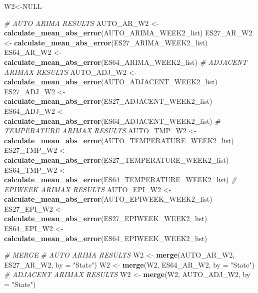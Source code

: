 \documentclass[
]{article}
\newenvironment{Shaded}{\begin{snugshade}}{\end{snugshade}}
\newcommand{\AttributeTok}[1]{\textcolor[rgb]{0.13,0.29,0.53}{#1}}
\newcommand{\CommentTok}[1]{\textcolor[rgb]{0.56,0.35,0.01}{\textit{#1}}}
\newcommand{\ConstantTok}[1]{\textcolor[rgb]{0.56,0.35,0.01}{#1}}
\newcommand{\FunctionTok}[1]{\textcolor[rgb]{0.13,0.29,0.53}{\textbf{#1}}}
\newcommand{\NormalTok}[1]{#1}
\newcommand{\OtherTok}[1]{\textcolor[rgb]{0.56,0.35,0.01}{#1}}
\newcommand{\StringTok}[1]{\textcolor[rgb]{0.31,0.60,0.02}{#1}}
\begin{document}
\begin{Shaded}
\begin{Highlighting}[]
\NormalTok{W2}\OtherTok{\textless{}{-}}\ConstantTok{NULL}

\CommentTok{\# AUTO ARIMA RESULTS}
\NormalTok{AUTO\_AR\_W2 }\OtherTok{\textless{}{-}} \FunctionTok{calculate\_mean\_abs\_error}\NormalTok{(AUTO\_ARIMA\_WEEK2\_list)}
\NormalTok{ES27\_AR\_W2 }\OtherTok{\textless{}{-}} \FunctionTok{calculate\_mean\_abs\_error}\NormalTok{(ES27\_ARIMA\_WEEK2\_list)}
\NormalTok{ES64\_AR\_W2 }\OtherTok{\textless{}{-}} \FunctionTok{calculate\_mean\_abs\_error}\NormalTok{(ES64\_ARIMA\_WEEK2\_list)}
\CommentTok{\# ADJACENT ARIMAX RESULTS}
\NormalTok{AUTO\_ADJ\_W2 }\OtherTok{\textless{}{-}} \FunctionTok{calculate\_mean\_abs\_error}\NormalTok{(AUTO\_ADJACENT\_WEEK2\_list)}
\NormalTok{ES27\_ADJ\_W2 }\OtherTok{\textless{}{-}} \FunctionTok{calculate\_mean\_abs\_error}\NormalTok{(ES27\_ADJACENT\_WEEK2\_list)}
\NormalTok{ES64\_ADJ\_W2 }\OtherTok{\textless{}{-}} \FunctionTok{calculate\_mean\_abs\_error}\NormalTok{(ES64\_ADJACENT\_WEEK2\_list)}
\CommentTok{\# TEMPERATURE ARIMAX RESULTS}
\NormalTok{AUTO\_TMP\_W2 }\OtherTok{\textless{}{-}} \FunctionTok{calculate\_mean\_abs\_error}\NormalTok{(AUTO\_TEMPERATURE\_WEEK2\_list)}
\NormalTok{ES27\_TMP\_W2 }\OtherTok{\textless{}{-}} \FunctionTok{calculate\_mean\_abs\_error}\NormalTok{(ES27\_TEMPERATURE\_WEEK2\_list)}
\NormalTok{ES64\_TMP\_W2 }\OtherTok{\textless{}{-}} \FunctionTok{calculate\_mean\_abs\_error}\NormalTok{(ES64\_TEMPERATURE\_WEEK2\_list)}
\CommentTok{\# EPIWEEK ARIMAX RESULTS}
\NormalTok{AUTO\_EPI\_W2 }\OtherTok{\textless{}{-}} \FunctionTok{calculate\_mean\_abs\_error}\NormalTok{(AUTO\_EPIWEEK\_WEEK2\_list)}
\NormalTok{ES27\_EPI\_W2 }\OtherTok{\textless{}{-}} \FunctionTok{calculate\_mean\_abs\_error}\NormalTok{(ES27\_EPIWEEK\_WEEK2\_list)}
\NormalTok{ES64\_EPI\_W2 }\OtherTok{\textless{}{-}} \FunctionTok{calculate\_mean\_abs\_error}\NormalTok{(ES64\_EPIWEEK\_WEEK2\_list)}

\CommentTok{\# MERGE}
\CommentTok{\# AUTO ARIMA RESULTS}
\NormalTok{W2 }\OtherTok{\textless{}{-}} \FunctionTok{merge}\NormalTok{(AUTO\_AR\_W2, ES27\_AR\_W2, }\AttributeTok{by =} \StringTok{"State"}\NormalTok{)}
\NormalTok{W2 }\OtherTok{\textless{}{-}} \FunctionTok{merge}\NormalTok{(W2, ES64\_AR\_W2, }\AttributeTok{by =} \StringTok{"State"}\NormalTok{)}
\CommentTok{\# ADJACENT ARIMAX RESULTS}
\NormalTok{W2 }\OtherTok{\textless{}{-}} \FunctionTok{merge}\NormalTok{(W2, AUTO\_ADJ\_W2, }\AttributeTok{by =} \StringTok{"State"}\NormalTok{)}
\end{Highlighting}
\end{Shaded}
\end{document}
